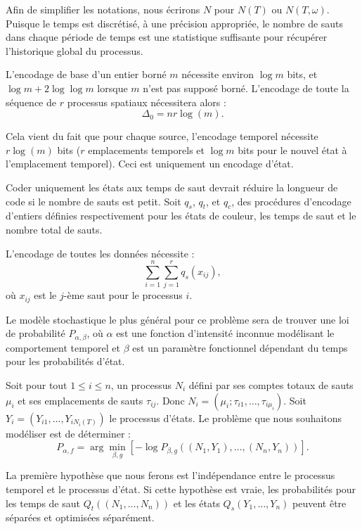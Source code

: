 \documentclass[11pt,a4paper]{article}
\begin{document}
	Afin de simplifier les notations, nous écrirons $N$ pour $N(T)$ ou $N(T,\omega)$. Puisque le temps est discrétisé, à une précision appropriée, le nombre de sauts dans chaque période de temps est une statistique suffisante pour récupérer l'historique global du processus.
	
	L'encodage de base d'un entier borné $m$ nécessite environ $\log m$ bits, et $\log m + 2 \log \log m$ lorsque $m$ n'est pas supposé borné. L'encodage de toute la séquence de $r$ processus spatiaux nécessitera alors :
	\begin{equation}
		\Delta_0=nr\log(m).
	\end{equation}
	
	Cela vient du fait que pour chaque source, l'encodage temporel nécessite $r\log(m)$ bits ($r$ emplacements temporels et $\log m$ bits pour le nouvel état à l'emplacement temporel). Ceci est uniquement un encodage d'état.
	
	Coder uniquement les états aux temps de saut devrait réduire la longueur de code si le nombre de sauts est petit. Soit $q_s$, $q_t$, et $q_c$, des procédures d'encodage d'entiers définies respectivement pour les états de couleur, les temps de saut et le nombre total de sauts.
	
	L'encodage de toutes les données nécessite :
	\begin{equation}
		\sum_{i=1}^n \sum_{j=1}^r q_s(x_{ij}),
	\end{equation}
	où $x_{ij}$ est le $j$-ème saut pour le processus $i$.
	
	Le modèle stochastique le plus général pour ce problème sera de trouver une loi de probabilité $P_{\alpha,\beta}$, où $\alpha$ est une fonction d'intensité inconnue modélisant le comportement temporel et $\beta$ est un paramètre fonctionnel dépendant du temps pour les probabilités d'état.
	
	Soit pour tout $1 \leq i \leq n$, un processus $N_i$ défini par ses comptes totaux de sauts $\mu_i$ et ses emplacements de sauts $\tau_{ij}$. Donc $N_i = (\mu_i ; \tau_{i1},\dots,\tau_{i\mu_i})$. Soit $Y_i = (Y_{i1},\dots,Y_{iN_i{(T)}})$ le processus d'états. Le problème que nous souhaitons modéliser est de déterminer :
	\begin{equation}
		P_{\alpha,f} = \arg \min_{\beta,g} \left [  -\log P_{\beta,g} \left ( (N_1,Y_1),\dots, (N_n,Y_n) \right ) \right ].
	\end{equation}
	
	La première hypothèse que nous ferons est l'indépendance entre le processus temporel et le processus d'état. Si cette hypothèse est vraie, les probabilités pour les temps de saut $Q_t \left ( (N_1,\dots,N_n) \right )$ et les états $Q_s(Y_1,\dots,Y_n)$ peuvent être séparées et optimisées séparément.
	
\end{document}
